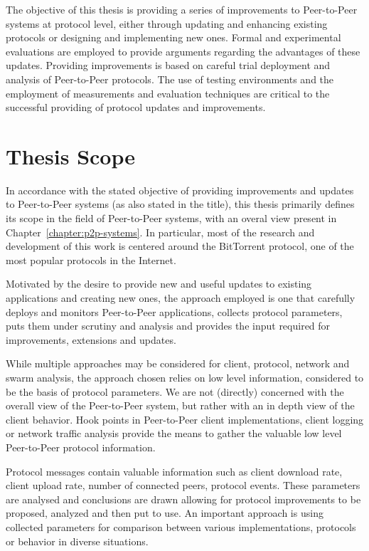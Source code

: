 The objective of this thesis is providing a series of improvements to
Peer-to-Peer systems at protocol level, either through updating and enhancing
existing protocols or designing and implementing new ones. Formal and
experimental evaluations are employed to provide arguments regarding the
advantages of these updates. Providing improvements is based on careful
trial deployment and analysis of Peer-to-Peer protocols. The use of testing
environments and the employment of measurements and evaluation techniques are
critical to the successful providing of protocol updates and improvements.

\section{Thesis Scope}
\label{sec:intro:scope}

In accordance with the stated objective of providing improvements and updates
to Peer-to-Peer systems (as also stated in the title), this thesis primarily
defines its scope in the field of Peer-to-Peer systems, with an overal view
present in Chapter~\ref{chapter:p2p-systems}. In particular, most of
the research and development of this work is centered around the BitTorrent
protocol, one of the most popular protocols in the Internet.

Motivated by the desire to provide new and useful updates to existing
applications and creating new ones, the approach employed is one that
carefully deploys and monitors Peer-to-Peer applications, collects protocol
parameters, puts them under scrutiny and analysis and provides the input
required for improvements, extensions and updates.

While multiple approaches may be considered for client, protocol, network and
swarm analysis, the approach chosen relies on low level information,
considered to be the basis of protocol parameters. We are not (directly)
concerned with the overall view of the Peer-to-Peer system, but rather with an
in depth view of the client behavior. Hook points in Peer-to-Peer client
implementations, client logging or network traffic analysis provide the means
to gather the valuable low level Peer-to-Peer protocol information.

Protocol messages contain valuable information such as client download rate,
client upload rate, number of connected peers, protocol events. These
parameters are analysed and conclusions are drawn allowing for protocol
improvements to be proposed, analyzed and then put to use. An important
approach is using collected parameters for comparison between various
implementations, protocols or behavior in diverse situations.

